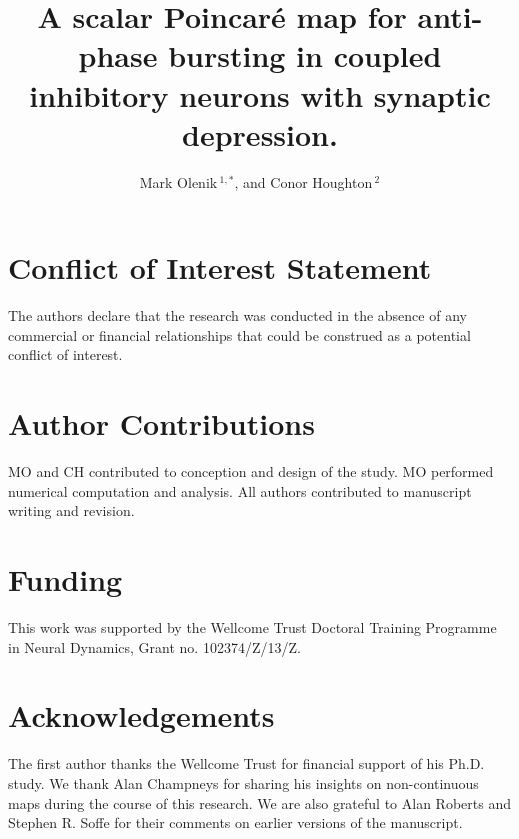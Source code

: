 \documentclass[utf8]{frontiersFPHY} %
\def\firstAuthorLast{Olenik {et~al.}} %
\def\Authors{Mark Olenik\,$^{1,*}$, and Conor Houghton\,$^{2}$}
\begin{document}
\onecolumn
{}


\title[Scalar Poincaré map for bursting]{A scalar Poincaré map for anti-phase bursting in coupled inhibitory neurons with synaptic depression.}


\author[\firstAuthorLast ]{\Authors} %
\address{} %
\correspondance{} %

\extraAuth{}%

\maketitle






\section*{Conflict of Interest Statement}
The authors declare that the research was conducted in the absence of any commercial or
financial relationships that could be construed as a potential conflict of interest.

\section*{Author Contributions}
MO and CH contributed to conception and design of the study.
MO performed numerical computation and analysis.
All authors contributed to manuscript writing and revision.

\section*{Funding}
This work was supported by the Wellcome Trust Doctoral Training Programme in Neural
Dynamics, Grant no. 102374/Z/13/Z.

\section*{Acknowledgements}
The first author thanks the Wellcome Trust for financial support of his Ph.D. study.
We thank Alan Champneys for sharing his insights on non-continuous maps during the course of this research.
We are also grateful to Alan Roberts and Stephen R. Soffe for their comments on earlier versions of the manuscript.
\end{document}
